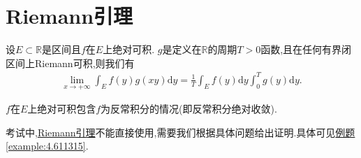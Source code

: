 \documentclass[../../main.tex]{subfiles}%
\begin{document}
\section{Riemann引理}

\begin{theorem}[Riemann引理]\label{theorem:Riemann引理}
设\(E\subset\mathbb{R}\)是区间且\(f\)在\(E\)上绝对可积. \(g\)是定义在\(\mathbb{R}\)的周期\(T > 0\)函数,且在任何有界闭区间上Riemann可积,则我们有
\begin{align}\label{equation:4.1-1.1}
\lim_{x\rightarrow +\infty}\int_{E}f(y)g(xy)\mathrm{d}y=\frac{1}{T}\int_{E}f(y)\mathrm{d}y\int_{0}^{T}g(y)\mathrm{d}y.
\end{align}
\end{theorem}
\begin{remark}
\(f\)在\(E\)上绝对可积包含$f$为反常积分的情况(即反常积分绝对收敛).

考试中,\hyperref[theorem:Riemann引理]{Riemann引理}不能直接使用,需要我们根据具体问题给出证明.具体可见\hyperref[example:4.611315]{例题\ref{example:4.611315}}.
\end{remark}
\end{document}
